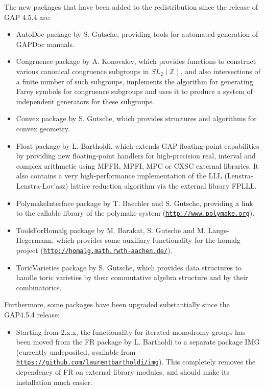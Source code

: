 \documentclass[a4paper,11pt]{report}
\begin{document}
{{{ The new packages that have been added to the redistribution since the release
of \textsf{GAP} 4.5.4 are: 
\begin{itemize}
\item  \textsf{AutoDoc} package by S. Gutsche, providing tools for automated generation of \textsf{GAPDoc} manuals. 
\item  \textsf{Congruence} package by A. Konovalov, which provides functions to construct various
canonical congruence subgroups in $SL_2({\ensuremath{\mathbb Z}})$, and also intersections of a finite number of such subgroups, implements the
algorithm for generating Farey symbols for congruence subgroups and uses it to
produce a system of independent generators for these subgroups. 
\item  \textsf{Convex} package by S. Gutsche, which provides structures and algorithms for convex
geometry. 
\item  \textsf{Float} package by L. Bartholdi, which extends \textsf{GAP} floating-point capabilities by providing new floating-point handlers for
high-precision real, interval and complex arithmetic using MPFR, MPFI, MPC or
CXSC external libraries. It also contains a very high-performance
implementation of the LLL (Lenstra-Lenstra-Lov{\a'a}sz) lattice reduction
algorithm via the external library FPLLL. 
\item  \textsf{PolymakeInterface} package by T. Baechler and S. Gutsche, providing a link to the callable
library of the \textsf{polymake} system (\href{http://www.polymake.org} {\texttt{http://www.polymake.org}}). 
\item  \textsf{ToolsForHomalg} package by M. Barakat, S. Gutsche and M. Lange-Hegermann, which provides some
auxiliary functionality for the \textsf{homalg} project (\href{http://homalg.math.rwth-aachen.de/} {\texttt{http://homalg.math.rwth-aachen.de/}}). 
\item  \textsf{ToricVarieties} package by S. Gutsche, which provides data structures to handle toric
varieties by their commutative algebra structure and by their combinatorics. 
\end{itemize}
 Furthermore, some packages have been upgraded substantially since the \textsf{GAP}{\nobreakspace}4.5.4 release: 
\begin{itemize}
\item  Starting from 2.x.x, the functionality for iterated monodromy groups has been
moved from the \textsf{FR} package by L. Bartholdi to a separate package IMG (currently undeposited,
available from \href{https://github.com/laurentbartholdi/img} {\texttt{https://github.com/laurentbartholdi/img}}). This completely removes the dependency of \textsf{FR} on external library modules, and should make its installation much easier. 
\end{itemize}
 }

}}
\end{document}
